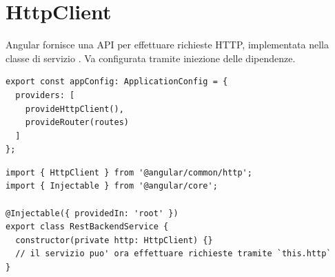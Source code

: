 \section{HttpClient}

Angular fornisce una API per effettuare richieste HTTP, implementata nella
classe di servizio . Va configurata tramite iniezione delle
dipendenze.

\begin{lstlisting}[style=ts, name=app.config.ts]
export const appConfig: ApplicationConfig = {
  providers: [
    provideHttpClient(),
    provideRouter(routes)
  ]
};
\end{lstlisting}

\begin{lstlisting}[style=ts, name=rest-backend.service.ts]
import { HttpClient } from '@angular/common/http';
import { Injectable } from '@angular/core';

@Injectable({ providedIn: 'root' })
export class RestBackendService {
  constructor(private http: HttpClient) {}
  // il servizio puo' ora effettuare richieste tramite `this.http`
}
\end{lstlisting}

